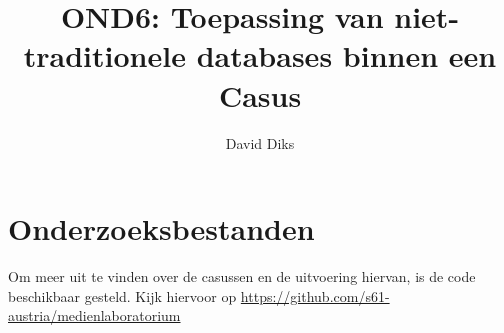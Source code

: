 \documentclass[12pt,a4paper]{scrreprt}
\title{OND6: Toepassing van niet-traditionele databases binnen een Casus\\}
\author{David Diks}
\begin{document}
	
	\maketitle
	\tableofcontents
	
	
	
	
	
	
	
	\appendix
	
\chapter{Onderzoeksbestanden}
Om meer  uit te vinden over de casussen en de uitvoering hiervan, is de code beschikbaar gesteld. Kijk hiervoor op \href{https://github.com/s61-austria/medienlaboratorium}{https://github.com/s61-austria/medienlaboratorium}
\end{document}
